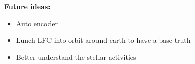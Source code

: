 \textbf{Future ideas:}
\begin{itemize}
    \item Auto encoder
    \item Lunch LFC into orbit around earth to have a base truth
    \item Better understand the stellar activities
\end{itemize}